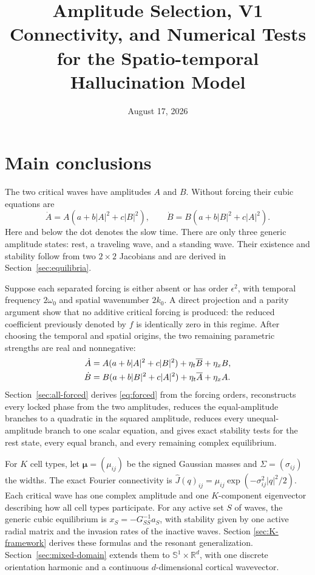 \documentclass[11pt]{article}
\title{Amplitude Selection, V1 Connectivity, and Numerical Tests\\
for the Spatio-temporal Hallucination Model}
\author{}
\date{August 17, 2026}
\newcommand{\Mu}{\bm{\mu}}
\begin{document}
\maketitle

\section{Main conclusions}

The two critical waves have amplitudes $A$ and $B$.  Without forcing their
cubic equations are
\begin{equation}
 \dot A=A(a+b|A|^2+c|B|^2),\qquad
 \dot B=B(a+b|B|^2+c|A|^2).
 \label{eq:unforced}
\end{equation}
Here and below the dot denotes the slow time.  There are only three generic
amplitude states: rest, a traveling wave, and a standing wave.  Their
existence and stability follow from two $2\times2$ Jacobians and are derived
in Section~\ref{sec:equilibria}.

Suppose each separated forcing is either absent or has order
$\epsilon^2$, with temporal frequency $2\omega_0$ and spatial wavenumber
$2k_0$.  A direct projection and a parity argument show that no additive
critical forcing is produced: the reduced coefficient previously denoted by
$f$ is identically zero in this regime.  After choosing the temporal and
spatial origins, the two remaining parametric strengths are real and
nonnegative:
\begin{align}
 \dot A&=A(a+b|A|^2+c|B|^2)+\eta_t\overline B+\eta_xB,\notag\\
 \dot B&=B(a+b|B|^2+c|A|^2)+\eta_t\overline A+\eta_xA.
 \label{eq:forced}
\end{align}
Section~\ref{sec:all-forced} derives \eqref{eq:forced} from the forcing
orders, reconstructs every locked phase from the two amplitudes, reduces the
equal-amplitude branches to a quadratic in the squared amplitude, reduces
every unequal-amplitude branch to one scalar equation, and gives exact
stability tests for the rest state, every equal branch, and every remaining
complex equilibrium.

For $K$ cell types, let $\Mu=(\mu_{ij})$ be the signed Gaussian masses and
$\Sigma=(\sigma_{ij})$ the widths.  The exact Fourier connectivity is
$\widehat J(q)_{ij}=\mu_{ij}\exp(-\sigma_{ij}^2|q|^2/2)$.  Each critical wave
has one complex amplitude and one $K$-component eigenvector describing how
all cell types participate.  For any active set $S$ of waves, the generic
cubic equilibrium is $x_S=-G_{SS}^{-1}a_S$, with stability given by one active
radial matrix and the invasion rates of the inactive waves.  Section
\ref{sec:K-framework} derives these formulas and the resonant generalization.
Section~\ref{sec:mixed-domain} extends them to
$\mathbb S^1\times\mathbb R^d$, with one discrete orientation harmonic and a
continuous $d$-dimensional cortical wavevector.
\end{document}
